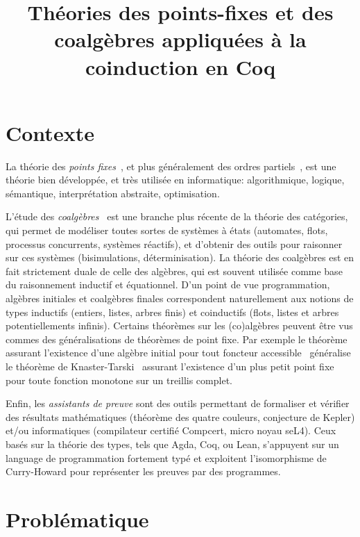 \documentclass[a4paper,11pt]{article}
\title{Théories des points-fixes et des coalgèbres appliquées à la coinduction en Coq}
\begin{document}
\maketitle

\section{Contexte}

La théorie des \emph{points fixes}~\cite{BIR67a}, et plus généralement des ordres partiels~\cite{DaveyPriestley90}, est une théorie bien développée, et très utilisée en informatique: algorithmique, logique, sémantique, interprétation abstraite, optimisation.

L'étude des \emph{coalgèbres}~\cite{jacobs:book} est une branche plus récente de la théorie des catégories, qui permet de modéliser toutes sortes de systèmes à états (automates, flots, processus concurrents, systèmes réactifs), et d'obtenir des outils pour raisonner sur ces systèmes (bisimulations, déterminisation).
%
La théorie des coalgèbres est en fait strictement duale de celle des algèbres, qui est souvent utilisée comme base du raisonnement inductif et équationnel. D'un point de vue programmation, algèbres initiales et coalgèbres finales correspondent naturellement aux notions de types inductifs (entiers, listes, arbres finis) et coinductifs (flots, listes et arbres potentiellements infinis).
%
Certains théorèmes sur les (co)algèbres peuvent être vus commes des généralisations de théorèmes de point fixe. Par exemple le théorème assurant l'existence d'une algèbre initial pour tout foncteur accessible~\cite{adamek1974free} généralise le théorème de Knaster-Tarski~\cite{Kna28,Tarski55} assurant l'existence d'un plus petit point fixe pour toute fonction monotone sur un treillis complet.

Enfin, les \emph{assistants de preuve} sont des outils permettant de formaliser et vérifier des résultats mathématiques (théorème des quatre couleurs, conjecture de Kepler) et/ou informatiques (compilateur certifié Compcert, micro noyau seL4). Ceux basés sur la théorie des types, tels que Agda, Coq, ou Lean, s'appuyent sur un language de programmation fortement typé et exploitent l'isomorphisme de Curry-Howard pour représenter les preuves par des programmes.

\section{Problématique}
\end{document}
